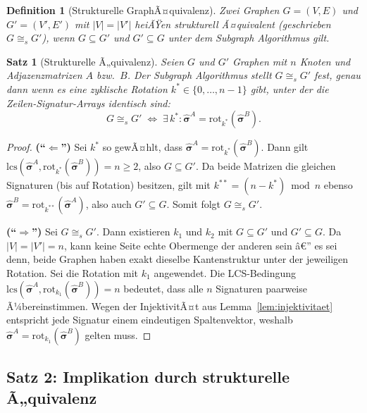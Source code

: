 ﻿\documentclass[12pt,a4paper]{report}
\newtheorem{definition}{Definition}[section]
\newtheorem{theorem}{Satz}[section]
\begin{document}
\begin{definition}[Strukturelle GraphÃ¤quivalenz]
\label{def:strukturell_aequivalent}
Zwei Graphen $G = (V, E)$ und $G' = (V', E')$ mit $|V| = |V'|$ heiÃŸen \emph{strukturell Ã¤quivalent} (geschrieben $G \cong_s G'$), wenn $G \subseteq G'$ \emph{und} $G' \subseteq G$ unter dem Subgraph Algorithmus gilt.
\end{definition}

\begin{theorem}[Strukturelle Ã„quivalenz]
\label{thm:strukturelle_aequivalenz}
Seien $G$ und $G'$ Graphen mit $n$ Knoten und Adjazenzmatrizen $A$ bzw.\ $B$. Der Subgraph Algorithmus stellt $G \cong_s G'$ fest, genau dann wenn es eine zyklische Rotation $k^* \in \{0,\ldots,n-1\}$ gibt, unter der die Zeilen-Signatur-Arrays identisch sind:
\[
G \cong_s G' \;\iff\; \exists\, k^* : \hat{\boldsymbol{\sigma}}^A = \mathrm{rot}_{k^*}(\hat{\boldsymbol{\sigma}}^B).
\]
\end{theorem}

\begin{proof}
\textbf{(``$\Leftarrow$'')} Sei $k^*$ so gewÃ¤hlt, dass $\hat{\boldsymbol{\sigma}}^A = \mathrm{rot}_{k^*}(\hat{\boldsymbol{\sigma}}^B)$. Dann gilt $\mathrm{lcs}(\hat{\boldsymbol{\sigma}}^A, \mathrm{rot}_{k^*}(\hat{\boldsymbol{\sigma}}^B)) = n \geq 2$, also $G \subseteq G'$. Da beide Matrizen die gleichen Signaturen (bis auf Rotation) besitzen, gilt mit $k^{**} = (n - k^*) \bmod n$ ebenso $\hat{\boldsymbol{\sigma}}^B = \mathrm{rot}_{k^{**}}(\hat{\boldsymbol{\sigma}}^A)$, also auch $G' \subseteq G$. Somit folgt $G \cong_s G'$.

\textbf{(``$\Rightarrow$'')} Sei $G \cong_s G'$. Dann existieren $k_1$ und $k_2$ mit $G \subseteq G'$ und $G' \subseteq G$. Da $|V| = |V'| = n$, kann keine Seite echte Obermenge der anderen sein â€” es sei denn, beide Graphen haben exakt dieselbe Kantenstruktur unter der jeweiligen Rotation. Sei die Rotation mit $k_1$ angewendet. Die LCS-Bedingung $\mathrm{lcs}(\hat{\boldsymbol{\sigma}}^A, \mathrm{rot}_{k_1}(\hat{\boldsymbol{\sigma}}^B)) = n$ bedeutet, dass alle $n$ Signaturen paarweise Ã¼bereinstimmen. Wegen der InjektivitÃ¤t aus Lemma~\ref{lem:injektivitaet} entspricht jede Signatur einem eindeutigen Spaltenvektor, weshalb $\hat{\boldsymbol{\sigma}}^A = \mathrm{rot}_{k_1}(\hat{\boldsymbol{\sigma}}^B)$ gelten muss.
\end{proof}

\subsection{Satz 2: Implikation durch strukturelle Ã„quivalenz}
\end{document}
